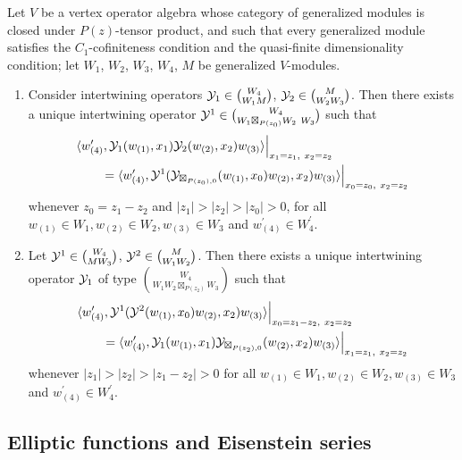 \documentclass[12pt]{article}
\begin{document}
\begin{thm}  \label{HLZassociativity}
  Let $V$ be a vertex operator algebra whose category of generalized modules is
  closed under $P(z)$-tensor product, and such that every generalized module satisfies
  the $C_1$-cofiniteness condition and the quasi-finite dimensionality condition;
  let $W_1$, $W_2$, $W_3$, $W_4$, $M$ be generalized $V$-modules.
  \begin{enumerate}
    \item Consider intertwining operators $\mathcal{Y}_1\in \binom{W_4}{W_1M}$,
      $\mathcal{Y}_2\in \binom{M}{W_2W_3}$. Then there exists a unique intertwining operator
      $\mathcal{Y}^1 \in \binom{W_4}{W_1\boxtimes_{P(z_0)} W_2\ W_3}$ such that
      \begin{align*}
        &\langle w_{(4)}^\prime, \mathcal{Y}_1(w_{(1)}, x_1)
            \mathcal{Y}_2(w_{(2)},x_2)w_{(3)}\rangle\Big|_{x_1 = z_1,\ x_2 = z_2}\\
        &\qquad = \langle w_{(4)}^\prime,
          \mathcal{Y}^1(\mathcal{Y}_{\boxtimes_{P(z_0),0}}(w_{(1)},x_0)w_{(2)},x_2)
            w_{(3)}\rangle\Big|_{x_0=z_0,\ x_2 = z_2}
      \end{align*}
    whenever $z_0 = z_1 - z_2$ and $|z_1| > |z_2| > |z_0| > 0$, for all
      $w_{(1)}\in W_1, w_{(2)}\in W_2,w_{(3)}\in W_3$ and $w_{(4)}^\prime \in W_4^\prime$.
    \item Let $\mathcal{Y}^1 \in \binom{W_4}{M W_3}$, $\mathcal{Y}^2 \in \binom{M}{W_1 W_2}$. Then
      there exists a unique intertwining operator $\mathcal{Y}_1$ of type
      $\binom{W_4}{W_1 W_2\boxtimes_{P(z_2)}W_3}$ such that
      \begin{align*}
        &\langle w_{(4)}^\prime, \mathcal{Y}^1(\mathcal{Y}^2(w_{(1)}, x_0)w_{(2)}, x_2)
          w_{(3)}\rangle \Big|_{x_0 = z_1 - z_2,\ x_2 = z_2}\\
        &\qquad = \langle w_{(4)}^\prime, \mathcal{Y}_1(w_{(1)},x_1)
          \mathcal{Y}_{\boxtimes_{P(z_2),0}}(w_{(2)},x_2)w_{(3)}\rangle\Big|_{x_1 = z_1,\ x_2 = z_2}
      \end{align*}
      whenever $|z_1| > |z_2| > |z_1 - z_2| > 0$ for all
      $w_{(1)}\in W_1, w_{(2)}\in W_2,w_{(3)}\in W_3$ and $w_{(4)}^\prime \in W_4^\prime$.
  \end{enumerate}
\end{thm}

\subsection{Elliptic functions and Eisenstein series}
\label{s-elliptic}
\end{document}
